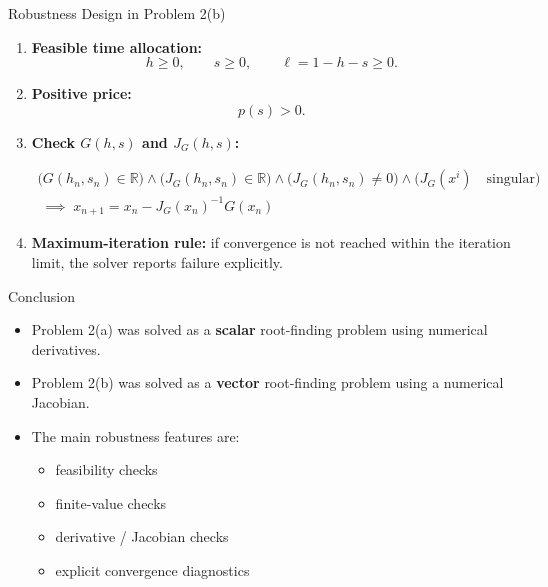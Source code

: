 \documentclass[9pt]{beamer}
\begin{document}
\begin{frame}{Robustness Design in Problem 2(b)}


\begin{enumerate}
    \item \textbf{Feasible time allocation:}
    \[
    h \ge 0,\qquad s \ge 0,\qquad \ell = 1-h-s \ge 0.
    \]

    \item \textbf{Positive price:}
    \[
    p(s) > 0.
    \]

    \item \textbf{Check $G(h,s)$ and $J_G(h,s)$:}

    \begin{align*}
        \bigl(G(h_n,s_n)\in\mathbb{R}\bigr)\land\bigl(J_G(h_n,s_n)\in\mathbb{R}\bigr)
        \land\bigl(J_G(h_n,s_n)\neq 0\bigr) \land\bigl(J_G(x^i) \quad \text{singular}\bigr) \\
        \;\implies\;
        x_{n+1}=x_n - J_G(x_n)^{-1} G(x_n)
    \end{align*}

    \item \textbf{Maximum-iteration rule:} if convergence is not reached within the iteration limit, the solver reports failure explicitly.
\end{enumerate}
\end{frame}


\begin{frame}{Conclusion}
\begin{itemize}
    \item Problem 2(a) was solved as a \textbf{scalar} root-finding problem using numerical derivatives.
    \item Problem 2(b) was solved as a \textbf{vector} root-finding problem using a numerical Jacobian.
    \item The main robustness features are:
    \begin{itemize}
        \item feasibility checks
        \item finite-value checks
        \item derivative / Jacobian checks
        \item explicit convergence diagnostics
    \end{itemize}
\end{itemize}

\end{frame}
\end{document}
